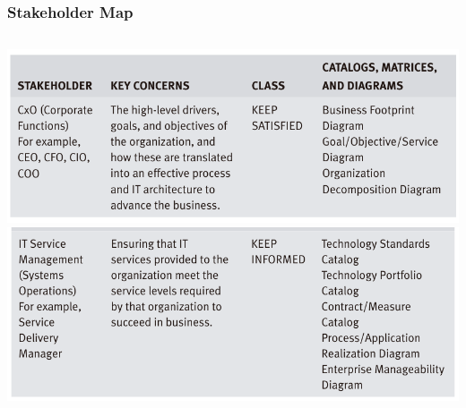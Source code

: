 \documentclass[aspectratio=169, table]{beamer}
\begin{document}
{\begin{frame}
\begin{columns}
\begin{column}{0.5\textwidth}
\begin{center}
                    \end{center}
                \end{column}
            \end{columns}

        \end{frame}
    }

    {
        \begin{frame}
            \frametitle{Stakeholder Map}
            \begin{columns}
                \begin{column}{0.5\textwidth}
                    \begin{center}
                        \includegraphics[width=\textwidth]{../figures/stakeholder_map_1}
                        \includegraphics[width=\textwidth]{../figures/stakeholder_map_3}
                    \end{center}


\end{column}
\end{columns}
\end{frame}}
\end{document}
